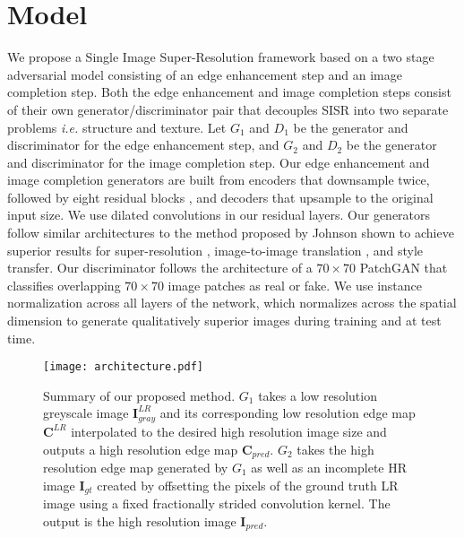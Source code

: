 \documentclass[10pt,twocolumn,letterpaper]{article}
\begin{document}
\section{Model}
We propose a Single Image Super-Resolution framework based on a two stage adversarial model \cite{goodfellow2014generative} consisting of an edge enhancement step and an image completion step. Both the edge enhancement and image completion steps consist of their own generator/discriminator pair that decouples SISR into two separate problems \textit{i.e.} structure and texture. Let $G_1$ and $D_1$ be the generator and discriminator for the edge enhancement step, and $G_2$ and $D_2$ be the generator and discriminator for the image completion step. Our edge enhancement and image completion generators are built from encoders that downsample twice, followed by eight residual blocks \cite{he2016deep}, and decoders that upsample to the original input size. We use dilated convolutions in our residual layers. 
Our generators follow similar architectures to the method proposed by Johnson \etal \cite{johnson2016perceptual} shown to achieve superior results for super-resolution \cite{sajjadi2017enhancenet, gondal2018unreasonable}, image-to-image translation \cite{zhu2017unpaired}, and style transfer. Our discriminator follows the architecture of a $70 \times 70$ PatchGAN \cite{isola2017image, zhu2017unpaired} that classifies overlapping $70 \times 70$ image patches as real or fake. We use instance normalization \cite{ulyanov2017improved} across all layers of the network, which normalizes across the spatial dimension to generate qualitatively superior images during training and at test time. 

\begin{figure*}
	\centering
	\texttt{[image: architecture.pdf]}
	\caption{Summary of our proposed method. $G_1$ takes a low resolution greyscale image $\mathbf{I}^{LR}_{gray}$ and its corresponding low resolution edge map $\mathbf{C}^{LR}$ interpolated to the desired high resolution image size and outputs a high resolution edge map $\mathbf{C}_{pred}$. $G_2$ takes the high resolution edge map generated by $G_1$ as well as an incomplete HR image $\mathbf{I}_{gt}$ created by offsetting the pixels of the ground truth LR image using a fixed fractionally strided convolution kernel. The output is the high resolution image $\mathbf{I}_{pred}$.}
	\label{seq3}
\end{figure*}
\end{document}
